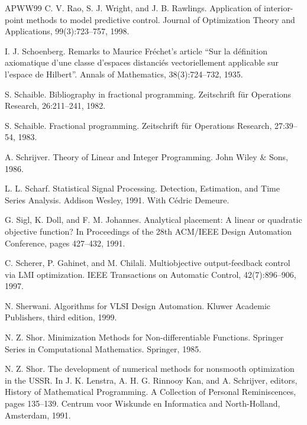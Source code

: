 \begin{thebibliography}{APWW99}
 C. V. Rao, S. J. Wright, and J. B. Rawlings. Application of interior-point methods to model predictive control. Journal of Optimization Theory and Applications, 99(3):723–757, 1998.

 I. J. Schoenberg. Remarks to Maurice Fréchet’s article “Sur la définition axiomatique d’une classe d’espaces distanciés vectoriellement applicable sur l’espace de Hilbert”. Annals of Mathematics, 38(3):724–732, 1935.

 S. Schaible. Bibliography in fractional programming. Zeitschrift für Operations Research, 26:211–241, 1982.

 S. Schaible. Fractional programming. Zeitschrift für Operations Research, 27:39–54, 1983.

 A. Schrijver. Theory of Linear and Integer Programming. John Wiley \& Sons, 1986.

 L. L. Scharf. Statistical Signal Processing. Detection, Estimation, and Time Series Analysis. Addison Wesley, 1991. With Cédric Demeure.

 G. Sigl, K. Doll, and F. M. Johannes. Analytical placement: A linear or quadratic objective function? In Proceedings of the 28th ACM/IEEE Design Automation Conference, pages 427–432, 1991.

 C. Scherer, P. Gahinet, and M. Chilali. Multiobjective output-feedback control via LMI optimization. IEEE Transactions on Automatic Control, 42(7):896–906, 1997.

 N. Sherwani. Algorithms for VLSI Design Automation. Kluwer Academic Publishers, third edition, 1999.

 N. Z. Shor. Minimization Methods for Non-differentiable Functions. Springer Series in Computational Mathematics. Springer, 1985.

 N. Z. Shor. The development of numerical methods for nonsmooth optimization in the USSR. In J. K. Lenstra, A. H. G. Rinnooy Kan, and A. Schrijver, editors, History of Mathematical Programming. A Collection of Personal Reminiscences, pages 135–139. Centrum voor Wiskunde en Informatica and North-Holland, Amsterdam, 1991.


\end{thebibliography}

